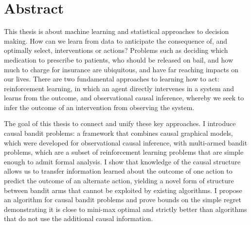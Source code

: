 \chapter*{Abstract}

This thesis is about machine learning and statistical approaches to decision making. How can we learn from data to anticipate the consequence of, and optimally select, interventions or actions? Problems such as deciding which medication to prescribe to patients, who should be released on bail, and how much to charge for insurance are ubiquitous, and have far reaching impacts on our lives. There are two fundamental approaches to learning how to act: reinforcement learning, in which an agent directly intervenes in a system and learns from the outcome, and observational causal inference, whereby we seek to infer the outcome of an intervention from observing the system. 

The goal of this thesis to connect and unify these key approaches. I introduce causal bandit problems: a framework that combines causal graphical models, which were developed for observational causal inference, with multi-armed bandit problems, which are a subset of reinforcement learning problems that are simple enough to admit formal analysis. I show that knowledge of the causal structure allows us to transfer information learned about the outcome of one action to predict the outcome of an alternate action, yielding a novel form of structure between bandit arms that cannot be exploited by existing algorithms. I propose an algorithm for causal bandit problems and prove bounds on the simple regret demonstrating it is close to mini-max optimal and strictly better than algorithms that do not use the additional causal information. 

